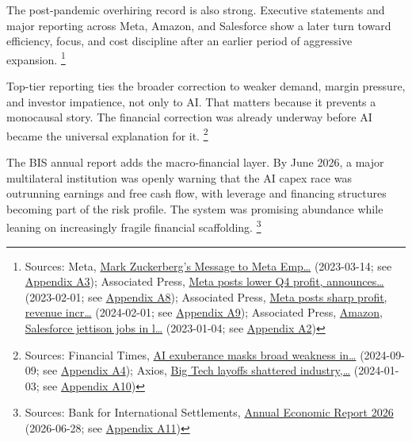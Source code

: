 \documentclass[
  american,
  11pt,
  letterpaper,
]{article}
\begin{document}
The post-pandemic overhiring record is also strong. Executive statements
and major reporting across Meta, Amazon, and Salesforce show a later
turn toward efficiency, focus, and cost discipline after an earlier
period of aggressive expansion. \footnote{Sources: Meta,
  \href{https://about.fb.com/news/2023/03/mark-zuckerberg-meta-year-of-efficiency/}{Mark
  Zuckerberg's Message to Meta Emp\ldots{}} (2023-03-14; see
  \hyperref[ch-05-appendix-a3-mark-zuckerberg-s-message-to-meta-employees]{Appendix
  A3}); Associated Press,
  \href{https://apnews.com/article/b884c9ac96be1c22f81d7243176a321d}{Meta
  posts lower Q4 profit, announces\ldots{}} (2023-02-01; see
  \hyperref[ch-05-appendix-a8-meta-posts-lower-q4-profit-announces-huge-stock-buyback]{Appendix
  A8}); Associated Press,
  \href{https://apnews.com/article/abc3e389d97fb97c661ccb6acfcf65c7}{Meta
  posts sharp profit, revenue incr\ldots{}} (2024-02-01; see
  \hyperref[ch-05-appendix-a9-meta-posts-sharp-profit-revenue-increase-in-q4-thanks-to-cost-cuts-and-advertising-rebound]{Appendix
  A9}); Associated Press,
  \href{https://apnews.com/article/bbb2f3a09eafdfc7cda54a3b87e538ad}{Amazon,
  Salesforce jettison jobs in l\ldots{}} (2023-01-04; see
  \hyperref[ch-05-appendix-a2-amazon-salesforce-jettison-jobs-in-latest-tech-worker-purge]{Appendix
  A2})}

Top-tier reporting ties the broader correction to weaker demand, margin
pressure, and investor impatience, not only to AI. That matters because
it prevents a monocausal story. The financial correction was already
underway before AI became the universal explanation for it. \footnote{Sources:
  Financial Times,
  \href{https://www.ft.com/content/0b14d871-2d19-46f1-9660-5466301e8066}{AI
  exuberance masks broad weakness in\ldots{}} (2024-09-09; see
  \hyperref[ch-05-appendix-a4-ai-exuberance-masks-broad-weakness-in-tech-sector-say-investors]{Appendix
  A4}); Axios,
  \href{https://www.axios.com/2024/01/03/tech-layoffs-google-microsoft-employees-impact-anxiety}{Big
  Tech layoffs shattered industry,\ldots{}} (2024-01-03; see
  \hyperref[ch-05-appendix-a10-big-tech-layoffs-shattered-industry-worker-confidence]{Appendix
  A10})}

The BIS annual report adds the macro-financial layer. By June 2026, a
major multilateral institution was openly warning that the AI capex race
was outrunning earnings and free cash flow, with leverage and financing
structures becoming part of the risk profile. The system was promising
abundance while leaning on increasingly fragile financial scaffolding.
\footnote{Sources: Bank for International Settlements,
  \href{https://www.bis.org/publ/arpdf/ar2026e.pdf}{Annual Economic
  Report 2026} (2026-06-28; see
  \hyperref[ch-05-appendix-a11-annual-economic-report-2026]{Appendix
  A11})}
\end{document}
